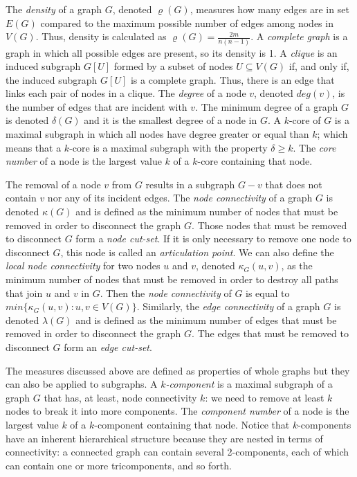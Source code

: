 The \emph{density} of a graph $G$, denoted $\varrho(G)$, measures how many edges are in set $E(G)$ compared to the maximum possible number of edges among nodes in $V(G)$. Thus, density is calculated as $\varrho(G) = \frac{2m}{n(n-1)}$. A \emph{complete graph} is a graph in which all possible edges are present, so its density is 1. A \emph{clique} is an induced subgraph $G[U]$ formed by a subset of nodes $U \subseteq V(G)$ if, and only if, the induced subgraph $G[U]$ is a complete graph. Thus, there is an edge that links each pair of nodes in a clique. The \emph{degree} of a node $v$, denoted $deg(v)$, is the number of edges that are incident with $v$. The minimum degree of a graph $G$ is denoted $\delta(G)$ and it is the smallest degree of a node in $G$. A $k$-core of $G$ is a maximal subgraph in which all nodes have degree greater or equal than $k$; which means that a $k$-core is a maximal subgraph with the property $\delta \ge k$. The \emph{core number} of a node is the largest value $k$ of a $k$-core containing that node.

The removal of a node $v$ from $G$ results in a subgraph $G - v$ that does not contain $v$ nor any of its incident edges. The \emph{node connectivity} of a graph $G$ is denoted $\kappa(G)$ and is defined as the minimum number of nodes that must be removed in order to disconnect the graph $G$. Those nodes that must be removed to disconnect $G$ form a \emph{node cut-set}. If it is only necessary to remove one node to disconnect $G$, this node is called an \emph{articulation point}. We can also define the \emph{local node connectivity} for two nodes $u$ and $v$, denoted $\kappa_{G}(u,v)$, as the minimum number of nodes that must be removed in order to destroy all paths that join $u$ and $v$ in $G$. Then the \emph{node connectivity} of $G$ is equal to $min{\{\kappa_{G}(u,v):u,v \in V(G)\}}$. Similarly, the \emph{edge connectivity} of a graph $G$ is denoted $\lambda(G)$ and is defined as the minimum number of edges that must be removed in order to disconnect the graph $G$. The edges that must be removed to disconnect $G$ form an \emph{edge cut-set}.

The measures discussed above are defined as properties of whole graphs but they can also be applied to subgraphs. A \emph{$k$-component} is a maximal subgraph of a graph $G$ that has, at least, node connectivity $k$: we need to remove at least $k$ nodes to break it into more components. The \emph{component number} of a node is the largest value $k$ of a $k$-component containing that node. Notice that $k$-components have an inherent hierarchical structure because they are nested in terms of connectivity: a connected graph can contain several 2-components, each of which can contain one or more tricomponents, and so forth. 

